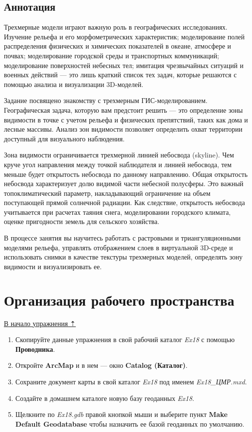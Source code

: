 \documentclass[12pt,]{book}
\begin{document}
\hypertarget{threed-modelling-annotation}{%
\subsection{Аннотация}\label{threed-modelling-annotation}}

Трехмерные модели играют важную роль в географических исследованиях. Изучение рельефа и его морфометрических характеристик; моделирование полей распределения физических и химических показателей в океане, атмосфере и почвах; моделирование городской среды и транспортных коммуникаций; моделирование поверхностей небесных тел; имитация чрезвычайных ситуаций и военных действий --- это лишь краткий список тех задач, которые решаются с помощью анализа и визуализации 3D-моделей.

Задание посвящено знакомству с трехмерным ГИС-моделированием. Географическая задача, которую вам предстоит решить --- это определение зоны видимости в точке с учетом рельефа и физических препятствий, таких как дома и лесные массивы. Анализ зон видимости позволяет определить охват территории доступный для визуального наблюдения.

Зона видимости ограничивается трехмерной линией небосвода (skyline). Чем круче угол направления между точкой наблюдателя и линией небосвода, тем меньше будет открытость небосвода по данному направлению. Общая открытость небосвода характеризует долю видимой части небесной полусферы. Это важный топоклиматический параметр, накладывающий ограничение на объем поступающей прямой солнечной радиации. Как следствие, открытость небосвода учитывается при расчетах таяния снега, моделировании городского климата, оценке пригодности земель для сельского хозяйства.

В процессе занятия вы научитесь работать с растровыми и триангуляционными моделями рельефа, управлять отображением слоев в виртуальной 3D-среде и использовать снимки в качестве текстуры трехмерных моделей, определять зону видимости и визуализировать ее.

\hypertarget{threed-modelling-workspace}{%
\section{Организация рабочего пространства}\label{threed-modelling-workspace}}

\protect\hyperlink{threed-modelling}{В начало упражнения ⇡}

\begin{enumerate}
\def\labelenumi{\arabic{enumi}.}
\item
  Скопируйте данные упражнения в свой рабочий каталог \emph{Ex18} с помощью \textbf{Проводника}.
\item
  Откройте \textbf{ArcMap} и в нем --- окно \textbf{Catalog (Каталог)}.
\item
  Сохраните документ карты в свой каталог \emph{Ex18} под именем \emph{Ex18\_ЦМР.mxd}.
\item
  Создайте в домашнем каталоге новую базу геоданных \emph{Ex18}.
\item
  Щелкните по \emph{Ex18.gdb} правой кнопкой мыши и выберите пункт \textbf{Make Default Geodatabase} чтобы назначить ее базой геоданных по умолчанию.
\end{enumerate}
\end{document}
